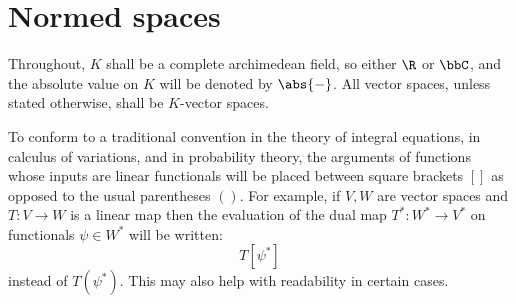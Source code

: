 \section{Normed spaces}
    Throughout, $K$ shall be a complete archimedean field, so either $\R$ or $\bbC$, and the absolute value on $K$ will be denoted by $\abs{-}$. All vector spaces, unless stated otherwise, shall be $K$-vector spaces.

    \begin{convention}
        To conform to a traditional convention in the theory of integral equations, in calculus of variations, and in probability theory, the arguments of functions whose inputs are linear functionals will be placed between square brackets $[]$ as opposed to the usual parentheses $()$. For example, if $V, W$ are vector spaces and $T: V \to W$ is a linear map then the evaluation of the dual map $T^*: W^* \to V^*$ on functionals $\psi \in W^*$ will be written:
            $$T[\psi^*]$$
        instead of $T(\psi^*)$. This may also help with readability in certain cases. 
    \end{convention}
 
